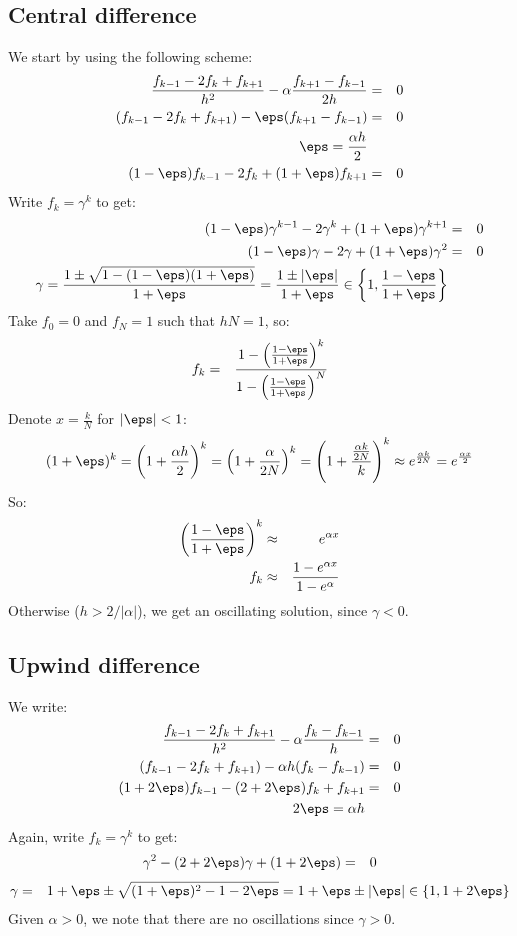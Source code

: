 \documentclass[11pt]{article}
\begin{document}
\subsection{Central difference}
We start by using the following scheme:
\begin{eqnarray}
  \frac{f_{k-1}-2f_k+f_{k+1}}{h^2}
  - \alpha \frac{f_{k+1}-f_{k-1}}{2h} &=& 0 \\
(f_{k-1}-2f_k+f_{k+1}) - \eps (f_{k+1}-f_{k-1}) &=& 0 \\
\eps = \frac{\alpha h}{2} \\
(1-\eps)f_{k-1}-2f_k+(1+\eps)f_{k+1} &=& 0
\end{eqnarray}
Write $f_k = \gamma^k$ to get:
\begin{eqnarray}
  (1-\eps)\gamma^{k-1} - 2\gamma^k + (1+\eps)\gamma^{k+1}&=& 0 \\
  (1-\eps)\gamma - 2\gamma + (1+\eps)\gamma^2&=& 0 \\
  \gamma = \frac{1 \pm \sqrt{1 - (1-\eps)(1+\eps)}}{1+\eps}
         = \frac{1 \pm |\eps|}{1+\eps} \in
           \left\{1, \frac{1- \eps}{1+\eps}\right\}
\end{eqnarray}
Take $f_0 = 0$ and $f_N = 1$ such that $h N = 1$, so:
\begin{eqnarray}
  f_k &=& \frac{1 - \left(\frac{1- \eps}{1+\eps}\right)^k}
  {1 - \left(\frac{1- \eps}{1+\eps}\right)^N}
\end{eqnarray}
Denote $x = \frac{k}{N}$ for $|\eps| < 1$:
\begin{eqnarray}
(1+\eps)^k = \left(1+\frac{\alpha h}{2}\right)^k =
\left(1+\frac{\alpha}{2N}\right)^k =
\left(1+\frac{\frac{\alpha k}{2N}}{k}\right)^k \approx
e^{\frac{\alpha k}{2N}} = e^{\frac{\alpha x}{2}}
\end{eqnarray}
So:
\begin{eqnarray}
  \left(\frac{1- \eps}{1+\eps}\right)^k &\approx& e^{\alpha x} \\
  f_k &\approx& \frac{1 - e^{\alpha x}}{1 - e^{\alpha}}
\end{eqnarray}
Otherwise ($h > 2/|\alpha|$), we get an oscillating solution, since $\gamma < 0$.
\subsection{Upwind difference}
We write:
\begin{eqnarray}
\frac{f_{k-1}-2f_k+f_{k+1}}{h^2} - \alpha \frac{f_k - f_{k-1}}{h} &=& 0 \\
(f_{k-1}-2f_k+f_{k+1}) - \alpha h (f_k - f_{k-1}) &=& 0 \\
(1 + 2\eps)f_{k-1}- (2 + 2\eps)f_k + f_{k+1} &=& 0 \\
2\eps = \alpha h
\end{eqnarray}
Again, write $f_k = \gamma^k$ to get:
\begin{eqnarray}
 \gamma^2 - (2 + 2\eps) \gamma + (1 + 2\eps) &=& 0
\end{eqnarray}
\begin{eqnarray}
\gamma &=& 1+\eps \pm \sqrt{(1+\eps)^2 - 1 - 2\eps} = 1 + \eps \pm |\eps| \in \{1, 1+2\eps\}
\end{eqnarray}
Given $\alpha > 0$, we note that there are no oscillations since $\gamma > 0$.
\end{document}
